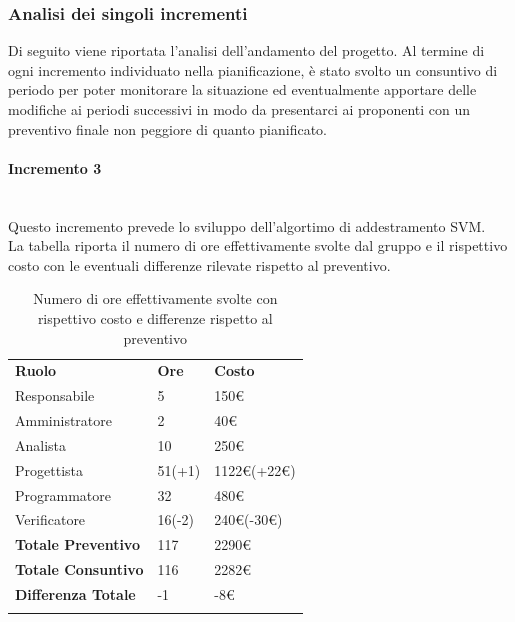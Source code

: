 \subsubsection{Analisi dei singoli incrementi}
Di seguito viene riportata l'analisi dell'andamento del progetto\glo. Al termine di ogni incremento individuato nella pianificazione, è stato svolto un consuntivo di periodo per poter monitorare la situazione ed eventualmente apportare delle modifiche ai periodi successivi in modo da presentarci ai proponenti con un preventivo finale non peggiore di quanto pianificato.
\paragraph{Incremento 3} \mbox{} \\
Questo incremento prevede lo sviluppo dell'algortimo di addestramento SVM\glo. \\
La tabella riporta il numero di ore effettivamente svolte dal gruppo e il rispettivo costo con le eventuali differenze rilevate rispetto al preventivo.
\begin{longtable} {							
		>{}p{40mm}  
		>{}p{20mm}	
		>{}p{28mm}			
	}			
	\rowcolor{gray!50}
	
	\textbf{Ruolo}            & \textbf{Ore} & \textbf{Costo}       \TBstrut \\
	Responsabile              & 5            & 150\euro             \TBstrut \\
	Amministratore            & 2            & 40\euro              \TBstrut \\
	Analista                  & 10           & 250\euro             \TBstrut \\
	Progettista               & 51(+1)       & 1122\euro(+22\euro)  \TBstrut \\
	Programmatore             & 32           & 480\euro             \TBstrut \\
	Verificatore              & 16(-2)       & 240\euro(-30\euro)   \TBstrut \\
	\textbf{Totale Preventivo}& 117          & 2290\euro            \TBstrut \\	
	\textbf{Totale Consuntivo}& 116          & 2282\euro            \TBstrut \\	
	\textbf{Differenza Totale}& -1           & -8\euro              \TBstrut \\
	\rowcolor{white}
	\caption{Numero di ore effettivamente svolte con rispettivo costo e differenze rispetto al preventivo}	
\end{longtable}

